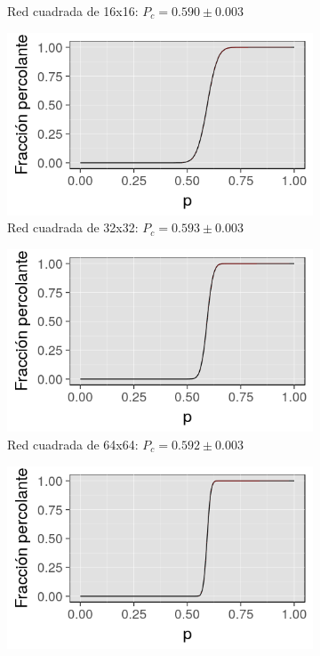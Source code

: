 \documentclass[%
 reprint,
 amsmath,amssymb,
 aps,
spanish]{revtex4-1}
\begin{document}
\begin{figure}[h]
\begin{subfigure}{.25\textwidth}
  \caption{Red cuadrada de 16x16: $P_c=0.590\pm0.003$}  
  \label{fig:1ahist}
\end{subfigure}%
\begin{subfigure}{.25\textwidth}
  \centering
  \includegraphics[width=.9\linewidth]{ej1b/32x32}
  \caption{Red cuadrada de 32x32: $P_c=0.593\pm0.003$}  
  \label{fig:1ahist}
\end{subfigure}
\begin{subfigure}{.25\textwidth}
  \centering
  \includegraphics[width=.9\linewidth]{ej1b/64x64}
  \caption{Red cuadrada de 64x64: $P_c=0.592\pm0.003$}  
  \label{fig:1ahist}
\end{subfigure}%
\begin{subfigure}{.25\textwidth}
  \centering
  \includegraphics[width=.9\linewidth]{ej1b/128x128}

\end{subfigure}
\end{figure}
\end{document}
